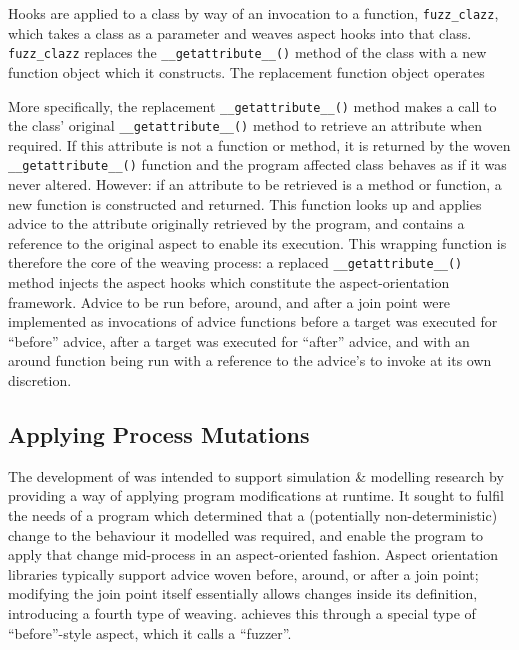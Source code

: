 Hooks are applied to a class by way of an invocation to a function,
\lstinline{fuzz_clazz}, which takes a class as a parameter and weaves aspect
hooks into that class. 
\lstinline{fuzz_clazz} replaces the \lstinline{__getattribute__()} method of the
class with a new function object which it constructs. The replacement function
object operates 

More specifically, the replacement \lstinline{__getattribute__()} method makes a
call to the class' original \lstinline{__getattribute__()} method to retrieve an
attribute when required. If this attribute is not a function or method, it is
returned by the woven \lstinline{__getattribute__()} function and the program
affected class behaves as if it was never altered. However: if an attribute to
be retrieved is a method or function, a new function is constructed and
returned. This function looks up and applies advice to the attribute originally
retrieved by the program, and contains a reference to the original aspect to
enable its execution. This wrapping function is therefore the core of the
weaving process: a replaced \lstinline{__getattribute__()} method injects the
aspect hooks which constitute the aspect-orientation framework. Advice to be run
before, around, and after a join point were implemented as invocations of advice
functions before a target was executed for ``before'' advice, after a target was
executed for ``after'' advice, and with an around function being run with a
reference to the advice's to invoke at its own discretion.

\subsection{Applying Process Mutations}\label{subsec:prior_work_mutations}
The development of \pdsf{} was intended to support simulation \& modelling
research by providing a way of applying program modifications at runtime. It
sought to fulfil the needs of a program which determined that a (potentially
non-deterministic) change to the behaviour it modelled was required, and enable
the program to apply that change mid-process in an aspect-oriented fashion.
Aspect orientation libraries typically support advice woven before, around, or
after a join point; modifying the join point itself essentially allows changes
inside its definition, introducing a fourth type of weaving. \pdsf achieves this
through a special type of ``before''-style aspect, which it calls a ``fuzzer''.

